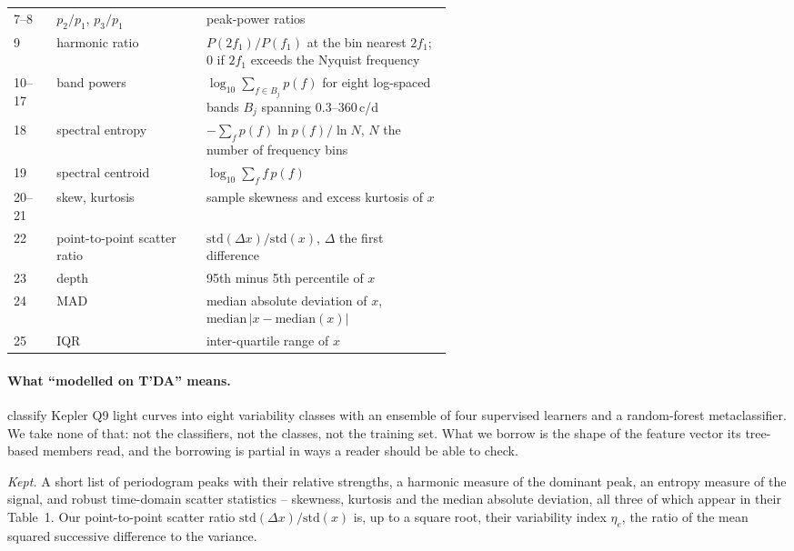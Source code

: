 \documentclass{article}
\providecommand{\DIFaddendFL}{} %
\DeclareRobustCommand{\DIFaddendFL}{\DIFOaddendFL \let\includegraphics\DIFOincludegraphics} %
\begin{document}
\begin{table}[H]
\begin{tabular}{llp{0.56\linewidth}}
7--8 & $p_{2}/p_{1}$, $p_{3}/p_{1}$ & peak-power ratios \\
9 & harmonic ratio & $P(2f_{1})/P(f_{1})$ at the bin nearest $2f_{1}$; $0$ if $2f_{1}$ exceeds the Nyquist frequency \\
10--17 & band powers & $\log_{10} \sum_{f \in B_{j}} p(f)$ for eight log-spaced bands $B_{j}$ spanning 0.3--360\,c/d \\
18 & spectral entropy & $-\sum_f p(f)\ln p(f) / \ln N$, $N$ the number of frequency bins \\
19 & spectral centroid & $\log_{10} \sum_f f\,p(f)$ \\
20--21 & skew, kurtosis & sample skewness and excess kurtosis of $x$ \\
22 & point-to-point scatter ratio & $\mathrm{std}(\Delta x)/\mathrm{std}(x)$, $\Delta$ the first difference \\
23 & depth & 95th minus 5th percentile of $x$ \\
24 & MAD & median absolute deviation of $x$, $\mathrm{median}\,|x - \mathrm{median}(x)|$ \\
25 & IQR & inter-quartile range of $x$ \\
\bottomrule
\end{tabular}
\DIFaddendFL \end{table}

\paragraph{What ``modelled on T'DA'' means.} \citet{audenaert2021} classify Kepler Q9 light curves
into eight variability classes with an ensemble of four supervised learners and a random-forest
metaclassifier. We take none of that: not the classifiers, not the classes, not the training set.
What we borrow is the shape of the feature vector its tree-based members read, and the borrowing is
partial in ways a reader should be able to check.

\emph{Kept.} A short list of periodogram peaks with their relative strengths, a harmonic
measure of the dominant peak, an entropy measure of the signal, and robust time-domain scatter
statistics -- skewness, kurtosis and the median absolute deviation, all three of which appear in
their Table~1. Our point-to-point scatter ratio $\mathrm{std}(\Delta x)/\mathrm{std}(x)$ is, up to a
square root, their variability index $\eta_{e}$, the ratio of the mean squared successive difference
to the variance.
\end{document}
